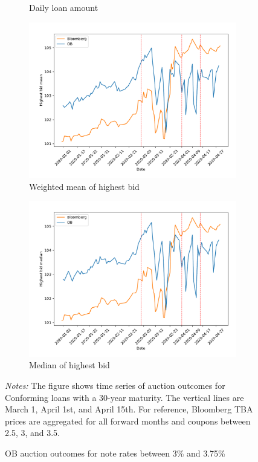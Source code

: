 \documentclass[11pt,a4paper]{article}
\begin{document}
\begin{figure}[h]
\begin{subfigure}[b]{0.49\textwidth}
      \caption{ Daily loan amount}
     \end{subfigure}
     \begin{subfigure}[b]{0.49\textwidth}
      \includegraphics[width=0.998\textwidth]{../results/figures/w_winner_bid_mean_mat30_loan1_timeseries_nr_3_3.75.pdf}
      \caption{ Weighted mean of highest bid}
     \end{subfigure}
     \begin{subfigure}[b]{0.49\textwidth}
      \includegraphics[width=0.998\textwidth]{../results/figures/winner_bid_median_mat30_loan1_timeseries_nr_3_3.75.pdf}
      \caption{ Median of highest bid}
     \end{subfigure}
   \caption{OB auction outcomes for note rates between 3\% and 3.75\%}
   \begin{minipage}{\textwidth}
      \footnotesize{\textit{Notes:} The figure shows time series of auction outcomes for Conforming loans with a 30-year maturity. The vertical lines are March 1, April 1st, and April 15th. For reference, Bloomberg TBA prices are aggregated for all forward months and coupons between 2.5, 3, and 3.5. } 
      \end{minipage}
\end{figure}
\end{document}
